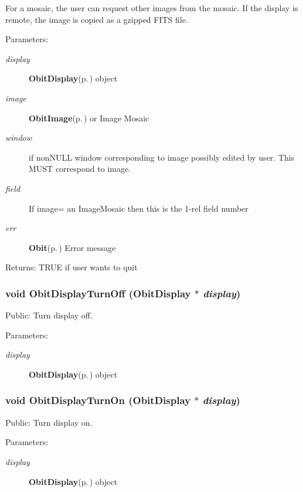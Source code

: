 For a mosaic, the user can request other images from the mosaic. If the display is remote, the image is copied as a gzipped FITS file. \begin{Desc}
\item[Parameters:]
\begin{description}
\item[{\em display}]{\bf Obit\-Display}{\rm (p.\,\pageref{structObitDisplay})} object \item[{\em image}]{\bf Obit\-Image}{\rm (p.\,\pageref{structObitImage})} or Image Mosaic \item[{\em window}]if non\-NULL window corresponding to image possibly edited by user. This MUST correspond to image. \item[{\em field}]If image= an Image\-Mosaic then this is the 1-rel field number \item[{\em err}]{\bf Obit}{\rm (p.\,\pageref{structObit})} Error message \end{description}
\end{Desc}
\begin{Desc}
\item[Returns:]TRUE if user wants to quit \end{Desc}
\subsubsection{\setlength{\rightskip}{0pt plus 5cm}void Obit\-Display\-Turn\-Off ({\bf Obit\-Display} $\ast$ {\em display})}\label{ObitDisplay_8c_a17}


Public: Turn display off. 

\begin{Desc}
\item[Parameters:]
\begin{description}
\item[{\em display}]{\bf Obit\-Display}{\rm (p.\,\pageref{structObitDisplay})} object \end{description}
\end{Desc}
\subsubsection{\setlength{\rightskip}{0pt plus 5cm}void Obit\-Display\-Turn\-On ({\bf Obit\-Display} $\ast$ {\em display})}\label{ObitDisplay_8c_a16}


Public: Turn display on. 

\begin{Desc}
\item[Parameters:]
\begin{description}
\item[{\em display}]{\bf Obit\-Display}{\rm (p.\,\pageref{structObitDisplay})} object \end{description}
\end{Desc}
